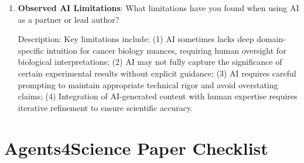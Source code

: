 \documentclass{article}
\begin{document}
\begin{enumerate}
    Answer: \involvementC{} %
    
    Explanation: The manuscript was primarily drafted by AI based on research specifications, experimental results, and scientific writing conventions. Human researchers provided guidance on structure, content priorities, technical accuracy, and biological interpretation. Final review and revisions were human-supervised.

    \item \textbf{Observed AI Limitations}: What limitations have you found when using AI as a partner or lead author? 

    Description: Key limitations include: (1) AI sometimes lacks deep domain-specific intuition for cancer biology nuances, requiring human oversight for biological interpretations; (2) AI may not fully capture the significance of certain experimental results without explicit guidance; (3) AI requires careful prompting to maintain appropriate technical rigor and avoid overstating claims; (4) Integration of AI-generated content with human expertise requires iterative refinement to ensure scientific accuracy.
\end{enumerate}

\newpage

\section*{Agents4Science Paper Checklist}
\end{document}
